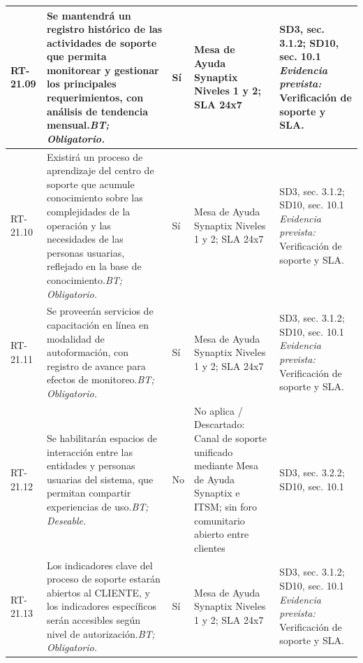\begin{paginaHorizontalSynaptix}
\begin{longtable}{|L{0.09\AnchoMatrizTDoce}|L{0.385\AnchoMatrizTDoce}|L{0.065\AnchoMatrizTDoce}|L{0.18\AnchoMatrizTDoce}|L{0.28\AnchoMatrizTDoce}|}
RT-\allowbreak{}21.\allowbreak{}09 &
Se mantendrá un registro histórico de las actividades de soporte que permita monitorear y gestionar los principales requerimientos, con análisis de tendencia mensual.\newline\textit{BT; Obligatorio.} &
Sí &
Mesa de Ayuda Synaptix Niveles 1 y 2; SLA 24x7 &
SD3, sec. 3.1.2; SD10, sec. 10.1 \newline\textit{Evidencia prevista:} Verificación de soporte y SLA. \\ \hline

RT-\allowbreak{}21.\allowbreak{}10 &
Existirá un proceso de aprendizaje del centro de soporte que acumule conocimiento sobre las complejidades de la operación y las necesidades de las personas usuarias, reflejado en la base de conocimiento.\newline\textit{BT; Obligatorio.} &
Sí &
Mesa de Ayuda Synaptix Niveles 1 y 2; SLA 24x7 &
SD3, sec. 3.1.2; SD10, sec. 10.1 \newline\textit{Evidencia prevista:} Verificación de soporte y SLA. \\ \hline

RT-\allowbreak{}21.\allowbreak{}11 &
Se proveerán servicios de capacitación en línea en modalidad de autoformación, con registro de avance para efectos de monitoreo.\newline\textit{BT; Obligatorio.} &
Sí &
Mesa de Ayuda Synaptix Niveles 1 y 2; SLA 24x7 &
SD3, sec. 3.1.2; SD10, sec. 10.1 \newline\textit{Evidencia prevista:} Verificación de soporte y SLA. \\ \hline

RT-\allowbreak{}21.\allowbreak{}12 &
Se habilitarán espacios de interacción entre las entidades y personas usuarias del sistema, que permitan compartir experiencias de uso.\newline\textit{BT; Deseable.} &
No &
No aplica / Descartado: Canal de soporte unificado mediante Mesa de Ayuda Synaptix e ITSM; sin foro comunitario abierto entre clientes &
SD3, sec. 3.2.2; SD10, sec. 10.1 \\ \hline

RT-\allowbreak{}21.\allowbreak{}13 &
Los indicadores clave del proceso de soporte estarán abiertos al CLIENTE, y los indicadores específicos serán accesibles según nivel de autorización.\newline\textit{BT; Obligatorio.} &
Sí &
Mesa de Ayuda Synaptix Niveles 1 y 2; SLA 24x7 &
SD3, sec. 3.1.2; SD10, sec. 10.1 \newline\textit{Evidencia prevista:} Verificación de soporte y SLA. \\ \hline


\end{longtable}
\end{paginaHorizontalSynaptix}

